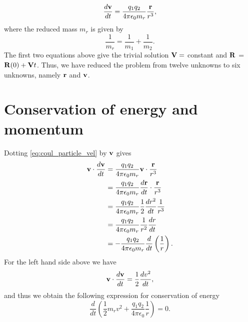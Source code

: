 \documentclass[a4paper,11pt]{report}
\begin{document}
\begin{equation}
    \label{eq:coul_particle_vel}
    \frac{d \mathbf{v}}{dt} = \frac{q_1 q_2}{4\pi \epsilon_0 m_r} \frac{\mathbf{r}}{r^3},
\end{equation}
where the reduced mass $m_r$ is given by
\begin{equation}
    \label{eq:coul_reduced_mass}
    \frac{1}{m_r} = \frac{1}{m_1} + \frac{1}{m_2}.
\end{equation}
The first two equations above give the trivial solution $\mathbf{V} = $ constant and $\mathbf{R}$ = $\mathbf{R}(0) + \mathbf{V} t$. Thus, we have reduced the problem from twelve unknowns to six unknowns, namely $\mathbf{r}$ and $\mathbf{v}$.

\section{Conservation of energy and momentum}
Dotting \cref{eq:coul_particle_vel} by $\mathbf{v}$ gives 
\begin{align*}
    \mathbf{v} \cdot \frac{d \mathbf{v}}{dt} &= \frac{q_1 q_2}{4 \pi \epsilon_0 m_r} \mathbf{v} \cdot \frac{\mathbf{r}}{r^3} \nonumber \\
    &= \frac{q_1 q_2}{4 \pi \epsilon_0 m_r} \frac{d\mathbf{r}}{dt} \cdot \frac{\mathbf{r}}{r^3} \nonumber \\
    &= \frac{q_1 q_2}{4 \pi \epsilon_0 m_r} \frac{1}{2} \frac{dr^2}{dt} \frac{1}{r^3} \nonumber \\
    &= \frac{q_1 q_2}{4 \pi \epsilon_0 m_r} \frac{1}{r^2} \frac{dr}{dt} \nonumber \\
    &= -\frac{q_1 q_2}{4 \pi \epsilon_0 m_r} \frac{d}{dt} \left ( \frac{1}{r} \right ).
\end{align*} 
For the left hand side above we have
\begin{equation*}
    \mathbf{v} \cdot \frac{d \mathbf{v}}{dt} = \frac{1}{2} \frac{d v^2}{dt},
\end{equation*}
and thus we obtain the following expression for conservation of energy
\begin{equation*}
    \frac{d}{dt} \left ( \frac{1}{2} m_r v^2 + \frac{q_1 q_2}{4 \pi \epsilon_0} \frac{1}{r} \right ) = 0.
\end{equation*}
\end{document}
